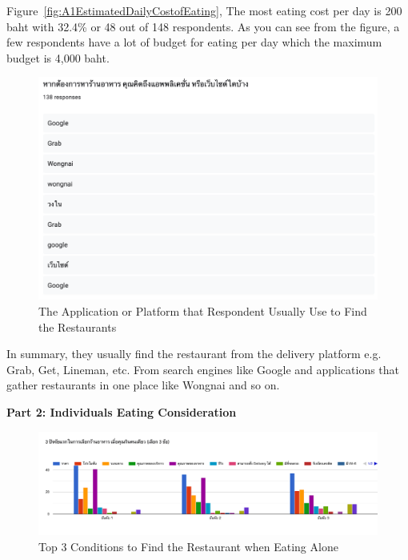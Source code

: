\documentclass[12pt,oneside,openright,a4paper]{cpe-english-project}
\begin{document}
Figure~\ref{fig:A1EstimatedDailyCostofEating}, The most eating cost per day is 200 baht with 32.4\% or 48 out of 148 respondents. As you can see from the figure, a few respondents have a lot of budget for eating per day which the maximum budget is 4,000 baht.

\begin{figure}[H]\centering
\includegraphics[width=350pt]{./images/A1TheApplicationorPlatformthatRespondentUsuallyUsetoFindtheRestaurants.png}
\caption{The Application or Platform that Respondent Usually Use to Find the Restaurants}\label{fig:A1TheApplicationorPlatformthatRespondentUsuallyUsetoFindtheRestaurants}
\end{figure}

In summary, they usually find the restaurant from the delivery platform e.g. Grab, Get, Lineman, etc. From search engines like Google and applications that gather restaurants in one place like Wongnai and so on.

\newpage
\textbf{Part 2: Individuals Eating Consideration}

\begin{figure}[H]\centering
\includegraphics[width=350pt]{./images/A1Top3ConditionstoFindtheRestaurantwhenEatingAlone.png}
\caption{Top 3 Conditions to Find the Restaurant when Eating Alone}\label{fig:A1Top3ConditionstoFindtheRestaurantwhenEatingAlone}
\end{figure}
\end{document}
